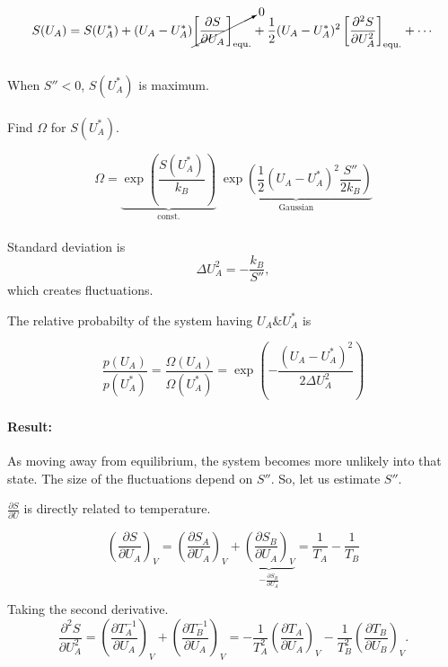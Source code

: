 \begin{equation}
    S(U_A)=S(U_A^*)+ (U_A-U_A^*)\cancelto{0}{\left[\frac{\partial S} {\partial U_A}\right]_\mathrm{equ.}} + \frac{1}{2}(U_A-U_A^*)^2 \left[\frac{\partial^2 S}{\partial U_A^2} \right]_\mathrm{equ.} + \cdots
\end{equation}
\\
When $S'' < 0$, $S(U_A^*)$ is maximum. 
\\ \quad \\
Find $\Omega$ for $S(U_A^*)$.

\begin{equation}
    \Omega = \underbrace{\exp \left({\frac{S(U_A^*)}{k_B} }\right)}_\mathrm{const.} \; \underbrace{\exp{\left(\frac{1}{2}(U_A-U_A^*)^2 \frac{S''}{2k_B}\right)}}_\mathrm{Gaussian}
\end{equation}
\\
Standard deviation is 
\begin{equation}
    \Delta U_A^2 = -\frac{k_B}{S''},
\end{equation}
which creates fluctuations.

The relative probabilty of the system having $U_A\&U_A^*$ is

\begin{equation}
    \frac{p(U_A)}{p(U_A^*)}=\frac{\Omega(U_A)}{\Omega(U_A^*)} = \exp{\left( -\frac{(U_A-U_A^*)^2}{2\Delta U_A^2} \right)}
\end{equation}

\paragraph{Result:} As moving away from equilibrium, the system becomes more unlikely into that state. The size of the fluctuations depend on $S''$. So, let us estimate $S''$.

$\frac{\partial S}{\partial U}$ is directly related to temperature.

\begin{equation}
    \left(\frac{\partial S}{\partial U_A}\right)_V =\left(\frac{\partial S_A}{\partial U_A}\right)_V+\underbrace{\left(\frac{\partial S_B}{\partial U_A}\right)_V}_{-\frac{\partial S_B}{\partial U_A}} = \frac{1}{T_A}-\frac{1}{T_B} 
\end{equation}
\newpage

Taking the second derivative.
\begin{equation}
    \frac{\partial^2 S}{\partial U_A^2}=\left(\frac{\partial T_A^{-1}}{\partial U_A}\right)_V + \left(\frac{\partial T_B^{-1}}{\partial U_A}\right)_V = -\frac{1}{T_A^2}\left(\frac{\partial T_A}{\partial U_A}\right)_V -\frac{1}{T_B^2}\left(\frac{\partial T_B}{\partial U_B}\right)_V.
\end{equation}

